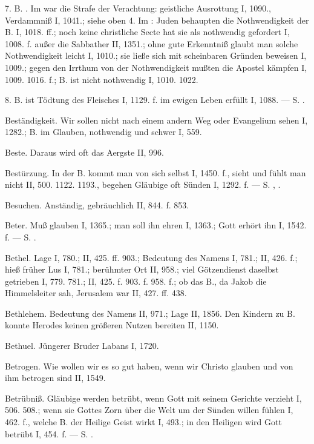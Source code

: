 7.  B. . Im  war die Strafe der Verachtung: geistliche Ausrottung I, 1090., Verdammniß I, 1041.; siehe oben 4. Im : Juden behaupten die Nothwendigkeit der B. I, 1018. ff.; noch keine christliche Secte hat sie als nothwendig gefordert I, 1008. f. außer die Sabbather II, 1351.; ohne gute Erkenntniß glaubt man solche Nothwendigkeit leicht I, 1010.; sie ließe sich mit scheinbaren Gründen beweisen I, 1009.; gegen den Irrthum von der Nothwendigkeit mußten die Apostel kämpfen I, 1009. 1016. f.; B. ist nicht nothwendig I, 1010. 1022.

8.  B. ist Tödtung des Fleisches I, 1129. f. im ewigen Leben erfüllt I, 1088. — S. .

Beständigkeit. Wir sollen nicht nach einem andern Weg oder Evangelium sehen I, 1282.; B. im Glauben, nothwendig und schwer I, 559.

Beste. Daraus wird oft das Aergste II, 996.

Bestürzung. In der B. kommt man von sich selbst I, 1450. f., sieht und fühlt man nicht II, 500. 1122. 1193., begehen Gläubige oft Sünden I, 1292. f. — S. , .

Besuchen. Anständig, gebräuchlich II, 844. f. 853.

Beter. Muß glauben I, 1365.; man soll ihn ehren I, 1363.; Gott erhört ihn I, 1542. f. — S. .

Bethel. Lage I, 780.; II, 425. ff. 903.; Bedeutung des Namens I, 781.; II, 426. f.; hieß früher Lus I, 781.; berühmter Ort II, 958.; viel Götzendienst daselbst getrieben I, 779. 781.; II, 425. f. 903. f. 958. f.; ob das B., da Jakob die Himmelsleiter sah, Jerusalem war II, 427. ff. 438.

Bethlehem. Bedeutung des Namens II, 971.; Lage II, 1856. Den Kindern zu B. konnte Herodes keinen größeren Nutzen bereiten II, 1150.

Bethuel. Jüngerer Bruder Labans I, 1720.

Betrogen. Wie wollen wir es so gut haben, wenn wir Christo glauben und von ihm betrogen sind II, 1549.

Betrübniß. Gläubige werden betrübt, wenn Gott mit seinem Gerichte verzieht I, 506. 508.; wenn sie Gottes Zorn über die Welt um der Sünden willen fühlen I, 462. f., welche B. der Heilige Geist wirkt I, 493.; in den Heiligen wird Gott betrübt I, 454. f. — S. .

